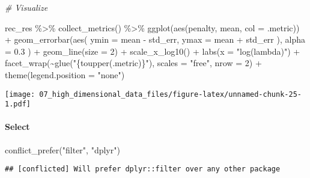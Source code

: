 \documentclass[
]{book}
\newenvironment{Shaded}{\begin{snugshade}}{\end{snugshade}}
\newcommand{\AttributeTok}[1]{\textcolor[rgb]{0.77,0.63,0.00}{#1}}
\newcommand{\CommentTok}[1]{\textcolor[rgb]{0.56,0.35,0.01}{\textit{#1}}}
\newcommand{\DecValTok}[1]{\textcolor[rgb]{0.00,0.00,0.81}{#1}}
\newcommand{\FloatTok}[1]{\textcolor[rgb]{0.00,0.00,0.81}{#1}}
\newcommand{\FunctionTok}[1]{\textcolor[rgb]{0.00,0.00,0.00}{#1}}
\newcommand{\NormalTok}[1]{#1}
\newcommand{\SpecialCharTok}[1]{\textcolor[rgb]{0.00,0.00,0.00}{#1}}
\newcommand{\StringTok}[1]{\textcolor[rgb]{0.31,0.60,0.02}{#1}}
\begin{document}
\begin{Shaded}
\begin{Highlighting}[]
\CommentTok{\# Visualize}

\NormalTok{rec\_res }\SpecialCharTok{\%\textgreater{}\%}
  \FunctionTok{collect\_metrics}\NormalTok{() }\SpecialCharTok{\%\textgreater{}\%}
  \FunctionTok{ggplot}\NormalTok{(}\FunctionTok{aes}\NormalTok{(penalty, mean, }\AttributeTok{col =}\NormalTok{ .metric)) }\SpecialCharTok{+}
  \FunctionTok{geom\_errorbar}\NormalTok{(}\FunctionTok{aes}\NormalTok{(}
    \AttributeTok{ymin =}\NormalTok{ mean }\SpecialCharTok{{-}}\NormalTok{ std\_err,}
    \AttributeTok{ymax =}\NormalTok{ mean }\SpecialCharTok{+}\NormalTok{ std\_err}
\NormalTok{  ),}
  \AttributeTok{alpha =} \FloatTok{0.3}
\NormalTok{  ) }\SpecialCharTok{+}
  \FunctionTok{geom\_line}\NormalTok{(}\AttributeTok{size =} \DecValTok{2}\NormalTok{) }\SpecialCharTok{+}
  \FunctionTok{scale\_x\_log10}\NormalTok{() }\SpecialCharTok{+}
  \FunctionTok{labs}\NormalTok{(}\AttributeTok{x =} \StringTok{"log(lambda)"}\NormalTok{) }\SpecialCharTok{+}
  \FunctionTok{facet\_wrap}\NormalTok{(}\SpecialCharTok{\textasciitilde{}}\FunctionTok{glue}\NormalTok{(}\StringTok{"\{toupper(.metric)\}"}\NormalTok{), }
             \AttributeTok{scales =} \StringTok{"free"}\NormalTok{,}
             \AttributeTok{nrow =} \DecValTok{2}\NormalTok{) }\SpecialCharTok{+}
  \FunctionTok{theme}\NormalTok{(}\AttributeTok{legend.position =} \StringTok{"none"}\NormalTok{)}
\end{Highlighting}
\end{Shaded}

\texttt{[image: 07\_high\_dimensional\_data\_files/figure-latex/unnamed-chunk-25-1.pdf]}

\hypertarget{select}{%
\paragraph{Select}\label{select}}

\begin{Shaded}
\begin{Highlighting}[]
\FunctionTok{conflict\_prefer}\NormalTok{(}\StringTok{"filter"}\NormalTok{, }\StringTok{"dplyr"}\NormalTok{)}
\end{Highlighting}
\end{Shaded}

\begin{verbatim}
## [conflicted] Will prefer dplyr::filter over any other package
\end{verbatim}
\end{document}

